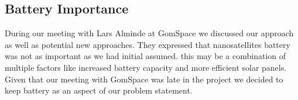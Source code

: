\subsection*{Battery Importance}
During our meeting with Lars Alminde at GomSpace we discussed our approach as well as potential new approaches. They expressed that nanosatellites battery was not as important as we had initial assumed\cite{gom_space_conversation}. this may be a combination of multiple factors like increased battery capacity and more efficient solar panels. Given that our meeting with GomSpace was late in the project we decided to keep battery as an aspect of our problem statement.


